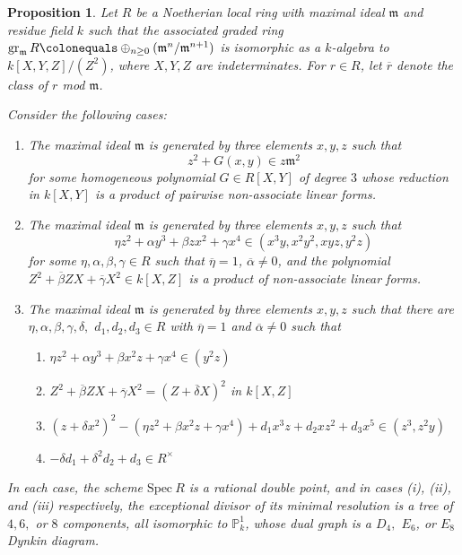 \documentclass[12pt]{amsart}
\numberwithin{equation}{section}
\newtheorem{prop}[equation]{Proposition}
\theoremstyle{definition}
\renewcommand{\P}{\mathbb P}
\newcommand{\Spec}{\mathrm{Spec} \ }
\renewcommand{\c}[1]{\overline{#1}}
\newcommand{\m}{\mathfrak{m}}
\DeclareMathOperator{\gr}{gr}
\begin{document}
\begin{prop}\cite[Section 24]{Lip69}\label{prop: Lipman results}
    Let $R$ be a Noetherian local ring with maximal ideal $\m$ and residue field $k$ such that the associated graded ring $\gr_\m R\colonequals \oplus_{n\geq0}(\m^n/\m^{n+1})$ is isomorphic as a $k$-algebra to $k[X,Y,Z]/(Z^2)$, where $X,Y,Z$ are indeterminates. For $r\in R$, let $\c{r}$ denote the class of $r$ \textup{mod} $\m$.
    
    Consider the following cases:
    \begin{enumerate}[\upshape (i)]
        \item
        The maximal ideal $\m$ is generated by three elements $x,y,z$ such that
        \[z^2+G(x,y)\in z\m^2\]
        for some homogeneous polynomial $G\in R[X,Y]$ of degree $3$ whose reduction in $k[X,Y]$ is a product of pairwise non-associate linear forms.
        \item 
        The maximal ideal $\m$ is generated by three elements $x,y,z$ such that
        \[\eta z^2+\alpha y^3+\beta zx^2+\gamma x^4\in(x^3y,x^2y^2,xyz,y^2z)\] for some $\eta,\alpha,\beta,\gamma\in R$ such that $\c{\eta}=1$, $\c{\alpha}\neq0$, and the polynomial $Z^2+\c{\beta}ZX+\c{\gamma}X^2\in k[X,Z]$ is a product of non-associate linear forms. 
        \item 
        The maximal ideal $\m$ is generated by three elements $x,y,z$ such that there are $\eta,\alpha,\beta,\gamma,\delta,$ $d_1,d_2,d_3\in R$ with $\c{\eta}=1$ and $\c{\alpha}\neq 0$ such that
        \begin{enumerate}[\upshape (a)]
            \item $\eta z^2+\alpha y^3+\beta x^2z+\gamma x^4\in (y^2z)$
            \item  $Z^2+\c{\beta}ZX+\c{\gamma}X^2=(Z+\c{\delta}X)^2$ in $k[X,Z]$
            \item $(z+\delta x^2)^2-(\eta z^2+\beta x^2z+\gamma x^4)+d_1x^3z+d_2xz^2+d_3x^5
            \in(z^3,z^2y)$
            \item $-\delta d_1+\delta^2d_2+d_3\in R^\times$
        \end{enumerate}
    \end{enumerate}
    In each case, the scheme $\Spec R$ is a rational double point, and in cases \textup{(i)}, \textup{(ii)}, and \textup{(iii)} respectively, the exceptional divisor of its minimal resolution is a tree of $4,6,$ or $8$ components, all isomorphic to $\P^1_k$, whose dual graph is a $D_4,$ $E_6$, or $E_8$ Dynkin diagram.
\end{prop}
\end{document}
